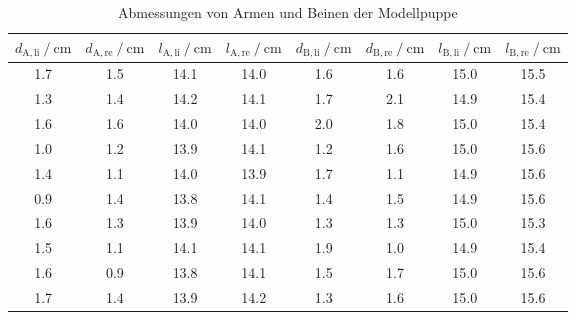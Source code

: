 \begin{table}
	\centering
	\caption{Abmessungen von Armen und Beinen der Modellpuppe}
	\label{tab:M5.1 Abmessungen Puppe}
	\begin{tabular}{S[table-format=1.1] S[table-format=1.1] S[table-format=2.1] S[table-format=2.1] S S S[table-format=2.1] S[table-format=2.1]}
	\toprule
{$d_{\mathup{A,li}} \:/\: \si{\centi\meter}$} & {$d_{\mathup{A,re}} \:/\: \si{\centi\meter}$} & {$l_{\mathup{A,li}}\:/\: \si{\centi\meter}$} & {$l_{\mathup{A,re}}\:/\: \si{\centi\meter}$} & {$d_{\mathup{B,li}} \:/\: \si{\centi\meter}$} & {$d_{\mathup{B,re}} \:/\: \si{\centi\meter}$} & {$l_{\mathup{B,li}}\:/\: \si{\centi\meter}$} & {$l_{\mathup{B,re}}\:/\: \si{\centi\meter}$}\\
	\midrule
1.7 &	1.5 	& 14.1	& 14.0 & 1.6  & 1.6 &  15.0 &   15.5 \\
1.3 &	1.4 	& 14.2	& 14.1 & 1.7  & 2.1 &  14.9 &   15.4  \\
1.6 &	1.6 	& 14.0	& 14.0 & 2.0  & 1.8 &  15.0 &   15.4  \\
1.0 &	1.2  	& 13.9	& 14.1 & 1.2  & 1.6 &  15.0 &   15.6  \\
1.4 &	1.1	& 14.0	& 13.9 & 1.7  & 1.1 &  14.9 &   15.6  \\
0.9 &	1.4	& 13.8	& 14.1 & 1.4  & 1.5 &  14.9 &   15.6  \\
1.6 &	1.3	& 13.9	& 14.0 & 1.3  & 1.3 &  15.0 &   15.3  \\
1.5 &	1.1	& 14.1	& 14.1 & 1.9  & 1.0 &  14.9 &   15.4  \\
1.6 &	0.9	& 13.8	& 14.1 & 1.5  & 1.7 &  15.0 &   15.6  \\
1.7 &	1.4	& 13.9	& 14.2 & 1.3  & 1.6 &  15.0 &   15.6  \\
\bottomrule
	\end{tabular}
\end{table}




